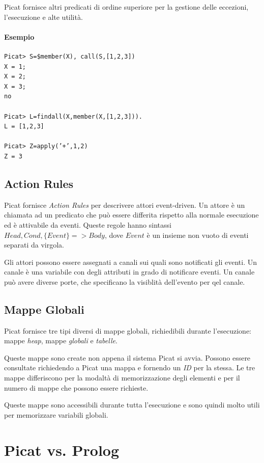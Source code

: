 \documentclass[12pt,a4paper,openright]{book} %
\begin{document}
Picat fornisce altri predicati di ordine superiore per la gestione delle eccezioni, l'esecuzione e alte utilità.

\paragraph{Esempio}
\begin{verbatim}
Picat> S=$member(X), call(S,[1,2,3])
X = 1;
X = 2;
X = 3;
no

Picat> L=findall(X,member(X,[1,2,3])).
L = [1,2,3]

Picat> Z=apply(’+’,1,2)
Z = 3
\end{verbatim}

\subsection{Action Rules}
\label{sec:picat_advanced_actionrules}

Picat fornisce \emph{Action Rules} per descrivere attori event-driven. Un attore è un chiamata ad un predicato che può essere differita rispetto alla normale esecuzione ed è attivabile da eventi. Queste regole hanno sintassi $Head, Cond, \{Event\} => Body$, dove $Event$ è un insieme non vuoto di eventi separati da virgola.

Gli attori possono essere assegnati a canali sui quali sono notificati gli eventi. Un canale è una variabile con degli attributi in grado di notificare eventi. Un canale può avere diverse porte, che specificano la visiblità dell'evento per qel canale. 

\subsection{Mappe Globali}
\label{sec:picat_advanced_globalmaps}

Picat fornisce tre tipi diversi di mappe globali, richiedibili durante l'esecuzione: mappe \emph{heap}, mappe \emph{globali} e \emph{tabelle}.

Queste mappe sono create non appena il sistema Picat si avvia. Possono essere consultate richiedendo a Picat una mappa e fornendo un \emph{ID} per la stessa. Le tre mappe differiscono per la modaltà di memorizzazione degli elementi e per il numero di mappe che possono essere richieste.

Queste mappe sono accessibili durante tutta l'esecuzione e sono quindi molto utili per memorizzare variabili globali.

\section{Picat vs. Prolog}
\label{sec:picat_picatvsprolog}
\end{document}
